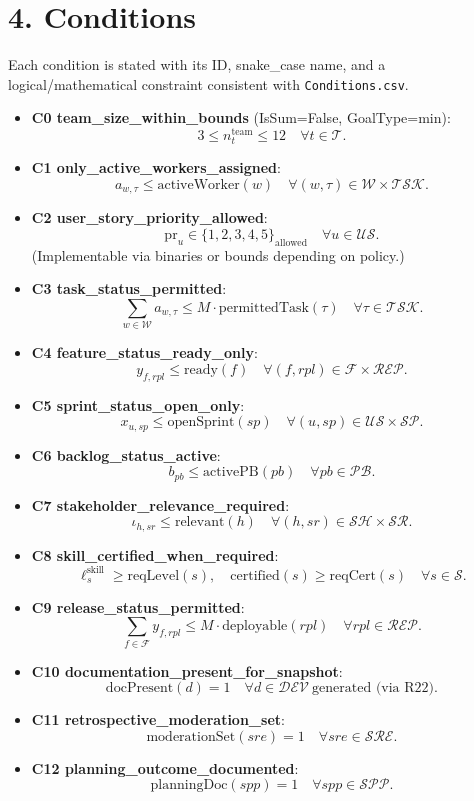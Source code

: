 \documentclass[a4paper,11pt]{article}
\begin{document}
\section{4. Conditions}
Each condition is stated with its ID, snake\_case name, and a logical/mathematical constraint consistent with \texttt{Conditions.csv}.

\begin{itemize}[leftmargin=2em]
  \item \textbf{C0 team\_size\_within\_bounds} (IsSum=False, GoalType=min): 
  \[
     3 \le n^{\text{team}}_{t} \le 12 \quad \forall t\in\mathcal{T}.
  \]
  \item \textbf{C1 only\_active\_workers\_assigned}:
  \[
     a_{w,\tau} \le \mathrm{activeWorker}(w) \quad \forall (w,\tau)\in \mathcal{W}\times\mathcal{TSK}.
  \]
  \item \textbf{C2 user\_story\_priority\_allowed}:
  \[
     \mathrm{pr}_u \in \{1,2,3,4,5\}_{\text{allowed}} \quad \forall u\in\mathcal{US}.
  \]
  (Implementable via binaries or bounds depending on policy.)
  \item \textbf{C3 task\_status\_permitted}:
  \[
     \sum_{w\in\mathcal{W}} a_{w,\tau} \le M\cdot \mathrm{permittedTask}(\tau) \quad \forall \tau\in\mathcal{TSK}.
  \]
  \item \textbf{C4 feature\_status\_ready\_only}:
  \[
     y_{f,rpl} \le \mathrm{ready}(f) \quad \forall (f,rpl)\in \mathcal{F}\times\mathcal{REP}.
  \]
  \item \textbf{C5 sprint\_status\_open\_only}:
  \[
     x_{u,sp} \le \mathrm{openSprint}(sp) \quad \forall (u,sp)\in \mathcal{US}\times\mathcal{SP}.
  \]
  \item \textbf{C6 backlog\_status\_active}:
  \[
     b_{pb} \le \mathrm{activePB}(pb) \quad \forall pb\in\mathcal{PB}.
  \]
  \item \textbf{C7 stakeholder\_relevance\_required}:
  \[
     \iota_{h,sr} \le \mathrm{relevant}(h) \quad \forall (h,sr)\in \mathcal{SH}\times\mathcal{SR}.
  \]
  \item \textbf{C8 skill\_certified\_when\_required}:
  \[
     \ell^{\text{skill}}_{s} \ge \mathrm{reqLevel}(s), \quad
     \mathrm{certified}(s) \ge \mathrm{reqCert}(s) \quad \forall s\in\mathcal{S}.
  \]
  \item \textbf{C9 release\_status\_permitted}:
  \[
     \sum_{f\in\mathcal{F}} y_{f,rpl} \le M\cdot \mathrm{deployable}(rpl) \quad \forall rpl\in\mathcal{REP}.
  \]
  \item \textbf{C10 documentation\_present\_for\_snapshot}:
  \[
     \mathrm{docPresent}(d)=1 \quad \forall d\in\mathcal{DEV}\ \text{generated (via R22)}.
  \]
  \item \textbf{C11 retrospective\_moderation\_set}:
  \[
     \mathrm{moderationSet}(sre)=1 \quad \forall sre\in\mathcal{SRE}.
  \]
  \item \textbf{C12 planning\_outcome\_documented}:
  \[
     \mathrm{planningDoc}(spp)=1 \quad \forall spp\in\mathcal{SPP}.
  \]
\end{itemize}
\end{document}
